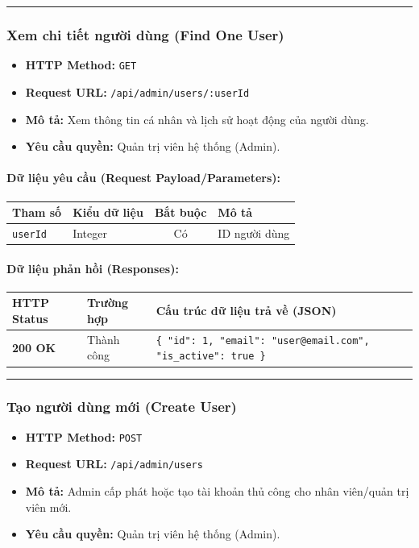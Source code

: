 \documentclass[12pt,a4paper]{article}
\begin{document}
\vskip 0.4cm
\noindent\rule{\textwidth}{0.3pt}
\vskip 0.4cm

\subsubsection{Xem chi tiết người dùng (Find One User)}
\begin{itemize}[leftmargin=*]
    \item \textbf{HTTP Method:} \texttt{GET}
    \item \textbf{Request URL:} \texttt{/api/admin/users/:userId}
    \item \textbf{Mô tả:} Xem thông tin cá nhân và lịch sử hoạt động của người dùng.
    \item \textbf{Yêu cầu quyền:} Quản trị viên hệ thống (Admin).
\end{itemize}

\paragraph{Dữ liệu yêu cầu (Request Payload/Parameters):}
\begin{longtable}{|>{\raggedright\arraybackslash}p{2.8cm}|>{\raggedright\arraybackslash}p{2.2cm}|c|>{\raggedright\arraybackslash}p{7.0cm}|}
\hline
\textbf{Tham số} & \textbf{Kiểu dữ liệu} & \textbf{Bắt buộc} & \textbf{Mô tả} \\ \hline
\endhead
\texttt{userId} & Integer & Có & ID người dùng \\ \hline
\end{longtable}

\paragraph{Dữ liệu phản hồi (Responses):}
\begin{longtable}{|>{\raggedright\arraybackslash}p{2.8cm}|>{\raggedright\arraybackslash}p{3.2cm}|>{\raggedright\arraybackslash}p{8.0cm}|}
\hline
\textbf{HTTP Status} & \textbf{Trường hợp} & \textbf{Cấu trúc dữ liệu trả về (JSON)} \\ \hline
\endhead
\textbf{200 OK} & Thành công & \texttt{\{ "id": 1, "email": "user@email.com", "is\_active": true \}} \\ \hline
\end{longtable}

\vskip 0.4cm
\noindent\rule{\textwidth}{0.3pt}
\vskip 0.4cm

\subsubsection{Tạo người dùng mới (Create User)}
\begin{itemize}[leftmargin=*]
    \item \textbf{HTTP Method:} \texttt{POST}
    \item \textbf{Request URL:} \texttt{/api/admin/users}
    \item \textbf{Mô tả:} Admin cấp phát hoặc tạo tài khoản thủ công cho nhân viên/quản trị viên mới.
    \item \textbf{Yêu cầu quyền:} Quản trị viên hệ thống (Admin).
\end{itemize}
\end{document}
